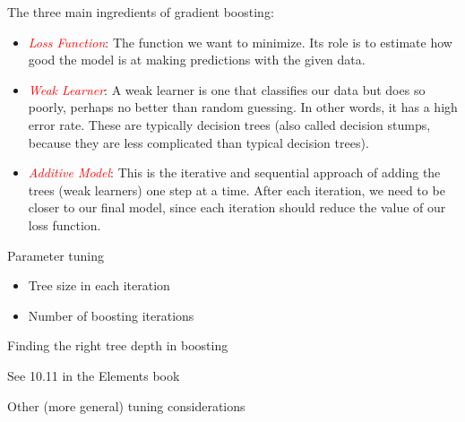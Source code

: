 \documentclass[
  10pt,
  ignorenonframetext,
]{beamer}
\begin{document}
\begin{frame}
The three main ingredients of gradient boosting:

\vspace{2mm}

\begin{itemize}
\item
  \emph{\textcolor{red}{Loss Function}}: The function we want to
  minimize. Its role is to estimate how good the model is at making
  predictions with the given data.
\item
  \emph{\textcolor{red}{Weak Learner}}: A weak learner is one that
  classifies our data but does so poorly, perhaps no better than random
  guessing. In other words, it has a high error rate. These are
  typically decision trees (also called decision stumps, because they
  are less complicated than typical decision trees).
\item
  \emph{\textcolor{red}{Additive Model}}: This is the iterative and
  sequential approach of adding the trees (weak learners) one step at a
  time. After each iteration, we need to be closer to our final model,
  since each iteration should reduce the value of our loss function.
\end{itemize}
\end{frame}

\begin{frame}{Parameter tuning}
\protect\hypertarget{parameter-tuning}{}
\(~\)

\begin{itemize}
\item
  Tree size in each iteration
\item
  Number of boosting iterations
\end{itemize}
\end{frame}

\begin{frame}
\begin{block}{Finding the right tree depth in boosting}
\protect\hypertarget{finding-the-right-tree-depth-in-boosting}{}
\(~\)

See 10.11 in the Elements book
\end{block}
\end{frame}

\begin{frame}
\begin{block}{Other (more general) tuning considerations}
\protect\hypertarget{other-more-general-tuning-considerations}{}
\end{block}
\end{frame}
\end{document}
